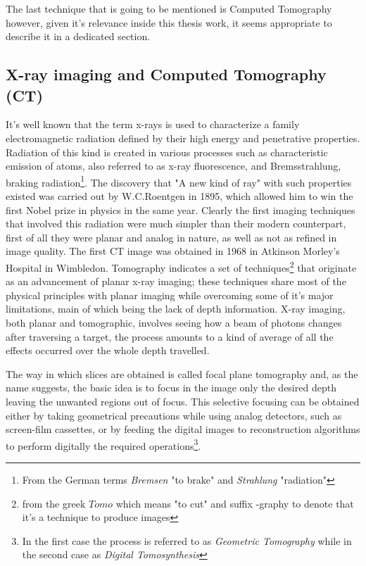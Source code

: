 The last technique that is going to be mentioned is Computed Tomography however, given it's relevance inside this thesis work, it seems appropriate to describe it in a dedicated section.

\subsection{X-ray imaging and Computed Tomography (CT)}
It's well known that the term x-rays is used to characterize a family electromagnetic radiation defined by their high energy and penetrative properties. Radiation of this kind is created in various processes such as characteristic emission of atoms, also referred to as x-ray fluorescence, and Bremsstrahlung, braking radiation\footnote{From the German terms \textit{Bremsen} "to brake" and \textit{Strahlung} "radiation"}. The discovery that "A new kind of ray"\cite{Roentgen} with such properties existed was carried out by W.C.Roentgen in 1895, which allowed him to win the first Nobel prize in physics in the same year. Clearly the first imaging techniques that involved this radiation were much simpler than their modern counterpart, first of all they were planar and analog in nature, as well as not as refined in image quality. The first CT image was obtained in 1968 in Atkinson Morley's Hospital in Wimbledon. Tomography indicates a set of techniques\footnote{from the greek $\textit{Tomo}$ which means "to cut" and suffix -graphy to denote that it's a technique to produce images} that originate as an advancement of planar x-ray imaging; these techniques share most of the physical principles with planar imaging while overcoming some of it's major limitations, main of which being the lack of depth information.  X-ray imaging, both planar and tomographic, involves seeing how a beam of photons changes after traversing a target, the process amounts to a kind of average of all the effects occurred over the whole depth travelled.

The way in which slices are obtained is called focal plane tomography and, as the name suggests, the basic idea is to focus in the image only the desired depth leaving the unwanted regions out of focus. This selective focusing can be obtained either by taking geometrical precautions while using analog detectors, such as screen-film cassettes, or by feeding the digital images to reconstruction algorithms to perform digitally the required operations\footnote{In the first case the process is referred to as \textit{Geometric Tomography} while in the second case as \textit{Digital Tomosynthesis}}.

